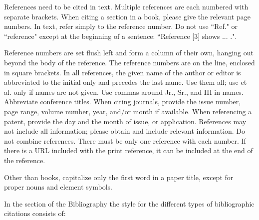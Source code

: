 \documentclass[eng,blind]{ajceam-class}
\begin{document}
References need to be cited in text. Multiple references are each numbered with separate brackets. When citing a section in a book, please give the relevant page numbers. In text, refer simply to the reference number. Do not use ``Ref." or ``reference" except at the beginning of a sentence: ``Reference [3] shows ... .".

Reference numbers are set flush left and form a column of their own, hanging out beyond the body of the reference. The reference numbers are on the line, enclosed in square brackets. In all references, the given name of the author or editor is abbreviated to the initial only and precedes the last name. Use them all; use et al. only if names are not given. Use commas around Jr., Sr., and III in names. Abbreviate conference titles.  When citing journals, provide the issue number, page range, volume number, year, and/or month if available. When referencing a patent, provide the day and the month of issue, or application. References may not include all information; please obtain and include relevant information. Do not combine references. There must be only one reference with each number. If there is a URL included with the print reference, it can be included at the end of the reference.

Other than books, capitalize only the first word in a paper title, except for proper nouns and element symbols.


In the section of the Bibliography the style for the different types of bibliographic citations consists of:
\end{document}
